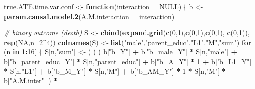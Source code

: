 \documentclass[
]{book}
\newenvironment{Shaded}{\begin{snugshade}}{\end{snugshade}}
\newcommand{\AttributeTok}[1]{\textcolor[rgb]{0.13,0.29,0.53}{#1}}
\newcommand{\CommentTok}[1]{\textcolor[rgb]{0.56,0.35,0.01}{\textit{#1}}}
\newcommand{\ConstantTok}[1]{\textcolor[rgb]{0.56,0.35,0.01}{#1}}
\newcommand{\ControlFlowTok}[1]{\textcolor[rgb]{0.13,0.29,0.53}{\textbf{#1}}}
\newcommand{\DecValTok}[1]{\textcolor[rgb]{0.00,0.00,0.81}{#1}}
\newcommand{\FunctionTok}[1]{\textcolor[rgb]{0.13,0.29,0.53}{\textbf{#1}}}
\newcommand{\NormalTok}[1]{#1}
\newcommand{\OtherTok}[1]{\textcolor[rgb]{0.56,0.35,0.01}{#1}}
\newcommand{\SpecialCharTok}[1]{\textcolor[rgb]{0.81,0.36,0.00}{\textbf{#1}}}
\newcommand{\StringTok}[1]{\textcolor[rgb]{0.31,0.60,0.02}{#1}}
\begin{document}
\begin{Shaded}
\begin{Highlighting}[]
\NormalTok{true.ATE.time.var.conf }\OtherTok{\textless{}{-}} \ControlFlowTok{function}\NormalTok{(}\AttributeTok{interaction =} \ConstantTok{NULL}\NormalTok{) \{}
\NormalTok{  b }\OtherTok{\textless{}{-}} \FunctionTok{param.causal.model.2}\NormalTok{(}\AttributeTok{A.M.interaction =}\NormalTok{ interaction)}
  
  \CommentTok{\# binary outcome (death)}
\NormalTok{  S }\OtherTok{\textless{}{-}} \FunctionTok{cbind}\NormalTok{(}\FunctionTok{expand.grid}\NormalTok{(}\FunctionTok{c}\NormalTok{(}\DecValTok{0}\NormalTok{,}\DecValTok{1}\NormalTok{),}\FunctionTok{c}\NormalTok{(}\DecValTok{0}\NormalTok{,}\DecValTok{1}\NormalTok{),}\FunctionTok{c}\NormalTok{(}\DecValTok{0}\NormalTok{,}\DecValTok{1}\NormalTok{), }\FunctionTok{c}\NormalTok{(}\DecValTok{0}\NormalTok{,}\DecValTok{1}\NormalTok{)), }\FunctionTok{rep}\NormalTok{(}\ConstantTok{NA}\NormalTok{,}\AttributeTok{n=}\DecValTok{2}\SpecialCharTok{\^{}}\DecValTok{4}\NormalTok{))}
  \FunctionTok{colnames}\NormalTok{(S) }\OtherTok{\textless{}{-}} \FunctionTok{list}\NormalTok{(}\StringTok{"male"}\NormalTok{,}\StringTok{"parent\_educ"}\NormalTok{,}\StringTok{"L1"}\NormalTok{,}\StringTok{"M"}\NormalTok{,}\StringTok{"sum"}\NormalTok{)}
  \ControlFlowTok{for}\NormalTok{ (n }\ControlFlowTok{in} \DecValTok{1}\SpecialCharTok{:}\DecValTok{16}\NormalTok{) \{}
\NormalTok{    S[n,}\StringTok{"sum"}\NormalTok{] }\OtherTok{\textless{}{-}}\NormalTok{ ( ( ( b[}\StringTok{"b\_Y"}\NormalTok{] }\SpecialCharTok{+} 
\NormalTok{                      b[}\StringTok{"b\_male\_Y"}\NormalTok{] }\SpecialCharTok{*}\NormalTok{ S[n,}\StringTok{"male"}\NormalTok{] }\SpecialCharTok{+} 
\NormalTok{                      b[}\StringTok{"b\_parent\_educ\_Y"}\NormalTok{] }\SpecialCharTok{*}\NormalTok{ S[n,}\StringTok{"parent\_educ"}\NormalTok{] }\SpecialCharTok{+} 
\NormalTok{                      b[}\StringTok{"b\_A\_Y"}\NormalTok{] }\SpecialCharTok{*} \DecValTok{1} \SpecialCharTok{+} 
\NormalTok{                      b[}\StringTok{"b\_L1\_Y"}\NormalTok{] }\SpecialCharTok{*}\NormalTok{ S[n,}\StringTok{"L1"}\NormalTok{] }\SpecialCharTok{+}
\NormalTok{                      b[}\StringTok{"b\_M\_Y"}\NormalTok{] }\SpecialCharTok{*}\NormalTok{ S[n,}\StringTok{"M"}\NormalTok{] }\SpecialCharTok{+}
\NormalTok{                      b[}\StringTok{"b\_AM\_Y"}\NormalTok{] }\SpecialCharTok{*} \DecValTok{1} \SpecialCharTok{*}\NormalTok{ S[n,}\StringTok{"M"}\NormalTok{] }\SpecialCharTok{*}\NormalTok{ b[}\StringTok{"A.M.inter"}\NormalTok{] ) }\SpecialCharTok{*}

\end{Highlighting}
\end{Shaded}
\end{document}
